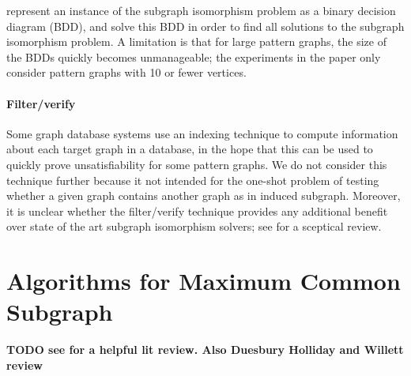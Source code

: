 \citet{DBLP:conf/RelMiCS/CortadellaV00} represent an instance of the subgraph
isomorphism problem as a binary decision diagram (BDD), and solve this BDD
in order to find all solutions to the subgraph isomorphism problem.  A limitation
is that for large
pattern graphs, the size of the BDDs quickly becomes unmanageable; the experiments
in the paper only consider pattern graphs with 10 or fewer vertices.

\paragraph*{Filter/verify} Some graph database systems use an indexing
technique to compute information about each target graph in a database, in the
hope that this can be used to quickly prove unsatisfiability for some pattern
graphs.  We do not consider this technique further because it not intended for
the one-shot problem of testing whether a given graph contains another graph as
in induced subgraph.  Moreover, it is unclear whether the filter/verify
technique provides any additional benefit over state of the art subgraph
isomorphism solvers; see \citet{DBLP:journals/jair/McCreeshPST18} for a
sceptical review.


\section{Algorithms for Maximum Common Subgraph}\label{sec:mcs-algorithms}

\textbf{TODO see \citet{DBLP:journals/jcamd/RaymondW02a} for a helpful lit review.
Also Duesbury Holliday and Willett review}

